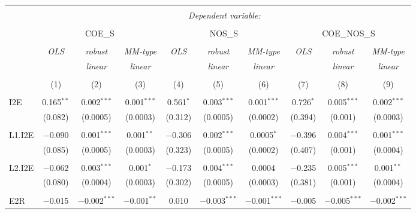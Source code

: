 
\begin{table}[!htbp] \centering 
  \caption{} 
  \label{} 
\begin{tabular}{@{\extracolsep{5pt}}lccccccccc} 
\\[-1.8ex]\hline 
\hline \\[-1.8ex] 
 & \multicolumn{9}{c}{\textit{Dependent variable:}} \\ 
\cline{2-10} 
\\[-1.8ex] & \multicolumn{3}{c}{COE\_S} & \multicolumn{3}{c}{NOS\_S} & \multicolumn{3}{c}{COE\_NOS\_S} \\ 
\\[-1.8ex] & \textit{OLS} & \textit{robust} & \textit{MM-type} & \textit{OLS} & \textit{robust} & \textit{MM-type} & \textit{OLS} & \textit{robust} & \textit{MM-type} \\ 
 & \textit{} & \textit{linear} & \textit{linear} & \textit{} & \textit{linear} & \textit{linear} & \textit{} & \textit{linear} & \textit{linear} \\ 
\\[-1.8ex] & (1) & (2) & (3) & (4) & (5) & (6) & (7) & (8) & (9)\\ 
\hline \\[-1.8ex] 
 I2E & 0.165$^{**}$ & 0.002$^{***}$ & 0.001$^{***}$ & 0.561$^{*}$ & 0.003$^{***}$ & 0.001$^{***}$ & 0.726$^{*}$ & 0.005$^{***}$ & 0.002$^{***}$ \\ 
  & (0.082) & (0.0005) & (0.0003) & (0.312) & (0.0005) & (0.0002) & (0.394) & (0.001) & (0.0003) \\ 
  & & & & & & & & & \\ 
 L1.I2E & $-$0.090 & 0.001$^{***}$ & 0.001$^{**}$ & $-$0.306 & 0.002$^{***}$ & 0.0005$^{*}$ & $-$0.396 & 0.004$^{***}$ & 0.001$^{***}$ \\ 
  & (0.085) & (0.0005) & (0.0003) & (0.323) & (0.0005) & (0.0002) & (0.407) & (0.001) & (0.0004) \\ 
  & & & & & & & & & \\ 
 L2.I2E & $-$0.062 & 0.003$^{***}$ & 0.001$^{*}$ & $-$0.173 & 0.004$^{***}$ & 0.0004 & $-$0.235 & 0.005$^{***}$ & 0.001$^{**}$ \\ 
  & (0.080) & (0.0004) & (0.0003) & (0.302) & (0.0005) & (0.0003) & (0.381) & (0.001) & (0.0004) \\ 
  & & & & & & & & & \\ 
 E2R & $-$0.015 & $-$0.002$^{***}$ & $-$0.001$^{**}$ & 0.010 & $-$0.003$^{***}$ & $-$0.001$^{***}$ & $-$0.005 & $-$0.005$^{***}$ & $-$0.002$^{***}$ \\ 

\end{tabular}
\end{table}
